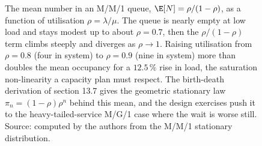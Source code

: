 \begin{figure}[htbp]
\centering
{}
\caption[The M/M/1 congestion wall]{The mean number in an M/M/1 queue,
$\E[N]=\rho/(1-\rho)$, as a function of utilisation $\rho=\lambda/\mu$.
The queue is nearly empty at low load and stays modest up to about
$\rho=0.7$, then the $\rho/(1-\rho)$ term climbs steeply and diverges as
$\rho\to 1$. Raising utilisation from $\rho=0.8$ (four in system) to
$\rho=0.9$ (nine in system) more than doubles the mean occupancy for a
$12.5\,\%$ rise in load, the saturation non-linearity a capacity plan
must respect. The birth-death derivation of section 13.7 gives the
geometric stationary law $\pi_n=(1-\rho)\rho^n$ behind this mean, and
the design exercises push it to the heavy-tailed-service M/G/1 case
where the wait is worse still. Source: computed by the authors from the
M/M/1 stationary distribution.}
\label{fig:vol02ch13:mm1-queue}
\end{figure}
